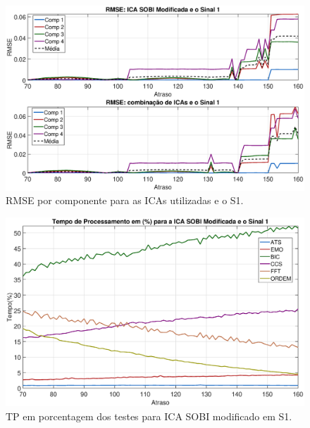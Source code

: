 \documentclass[a4paper,12pt]{monografia}
\theoremstyle{plain}
\theoremstyle{definition}
\theoremstyle{remark}
\begin{document}
\begin{figure}[!htb]
    \begin{center}
    \advance\leftskip -1.5cm
    \includegraphics[scale=0.45]{imagens/ImagensParaOAnexo/RMSEcompATodasICAsSinal1.eps}
    \caption{RMSE por componente para as ICAs utilizadas e o S1.}
    \label{fig:RMSEAS1}    
    \end{center}
\end{figure}

\begin{figure}[!htb]
    \begin{center}
    \advance\leftskip -1.5cm
    \includegraphics[scale=0.45]{imagens/ImagensParaOAnexo/TPPAICASOBImodSinal1.eps}
    \caption{TP em porcentagem dos testes para ICA SOBI modificado em S1.}
    \label{fig:TPSMAS1}    
    \end{center}
\end{figure}
\end{document}

